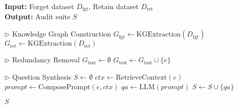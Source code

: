 \begin{algorithm}[tb]
    \small
    \caption{\sys}
    \label{alg:selective_forgetting}
    \textbf{Input:} Forget dataset $D_{\text{fgt}}$, Retain dataset $D_{\text{ret}}$ \\
    \textbf{Output:} Audit suite $S$
    \begin{algorithmic}[1]
            \State $\triangleright$ Knowledge Graph Construction
            \State $G_{\text{fgt}} \gets \text{KGExtraction}(D_{\text{fgt}})$ 
            \State $G_{\text{ret}} \gets \text{KGExtraction}(D_{\text{ret}})$ 
            
            \State $\triangleright$ Redundancy Removal
            \State $G_{\text{test}} \gets \emptyset$
                    \State $G_{\text{test}} \gets G_{\text{test}} \cup \{e\}$
                \EndIf
            \EndFor
            
            \State $\triangleright$ Question Synthesis
            \State $S \gets \emptyset$
                \State $ctx \gets \text{RetrieveContext}(e)$ 
                \State $prompt \gets \text{ComposePrompt}(e, ctx)$ 
                \State $qa \gets \text{LLM}(prompt)$
                \State $S \gets S \cup \{qa\}$
            \EndFor
            
            \State \Return $S$
        \EndFunction
    \end{algorithmic}
    \end{algorithm}
    
    